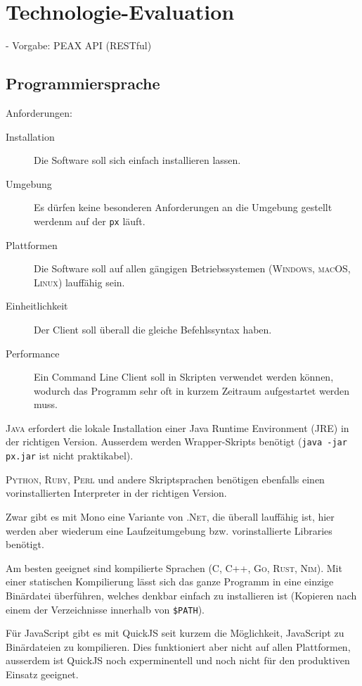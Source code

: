 \section{Technologie-Evaluation}

- Vorgabe: PEAX API (RESTful)

\subsection{Programmiersprache}

Anforderungen:

\begin{description}
    \item[Installation] Die Software soll sich einfach installieren lassen.
    \item[Umgebung] Es dürfen keine besonderen Anforderungen an die Umgebung gestellt werdenm auf der \texttt{px} läuft.
    \item[Plattformen] Die Software soll auf allen gängigen Betriebssystemen (\textsc{Windows}, \textsc{macOS}, \textsc{Linux}) lauffähig sein.
    \item[Einheitlichkeit] Der Client soll überall die gleiche Befehlssyntax haben.
    \item[Performance] Ein Command Line Client soll in Skripten verwendet werden können, wodurch das Programm sehr oft in kurzem Zeitraum aufgestartet werden muss.
\end{description}

\textsc{Java} erfordert die lokale Installation einer Java Runtime Environment (JRE) in der richtigen Version. Ausserdem werden Wrapper-Skripts benötigt (\texttt{java -jar px.jar} ist nicht praktikabel).

\textsc{Python}, \textsc{Ruby}, \textsc{Perl} und andere Skriptsprachen benötigen ebenfalls einen vorinstallierten Interpreter in der richtigen Version.

Zwar gibt es mit Mono eine Variante von \textsc{.Net}, die überall lauffähig ist, hier werden aber wiederum eine Laufzeitumgebung bzw. vorinstallierte Libraries benötigt.

Am besten geeignet sind kompilierte Sprachen (C, C++, \textsc{Go}, \textsc{Rust}, \textsc{Nim}). Mit einer statischen Kompilierung lässt sich das ganze Programm in eine einzige Binärdatei überführen, welches denkbar einfach zu installieren ist (Kopieren nach einem der Verzeichnisse innerhalb von \texttt{\$PATH}).

Für JavaScript gibt es mit QuickJS seit kurzem die Möglichkeit, JavaScript zu Binärdateien zu kompilieren. Dies funktioniert aber nicht auf allen Plattformen, ausserdem ist QuickJS noch experminentell und noch nicht für den produktiven Einsatz geeignet.

